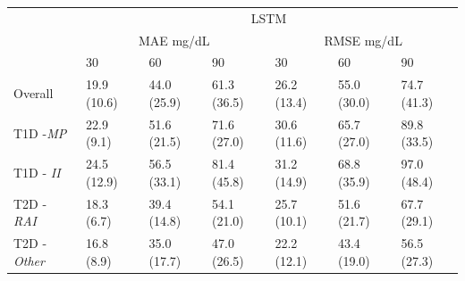 \begin{table}[b!]
\begin{tabular}{lllllll}
			& \multicolumn{6}{c}{LSTM}                                              \\ \cline{2-7}
			\multicolumn{1}{l|}{}                           & \multicolumn{3}{c|}{MAE mg/dL}          & \multicolumn{3}{c|}{RMSE mg/dL}         \\ \cline{2-7}
			\multicolumn{1}{l|}{}                           & 30 & 60 & \multicolumn{1}{l|}{90} & 30 & 60 & \multicolumn{1}{l|}{90} \\ \hline
			\multicolumn{1}{l|}{Overall}                & 19.9 (10.6) & 44.0 (25.9) & \multicolumn{1}{l|}{61.3 (36.5)} & 26.2 (13.4) & 55.0 (30.0) & \multicolumn{1}{l|}{74.7 (41.3)} \\
			\multicolumn{1}{l|}{T1D -{\sl  MP}}   & 22.9 (9.1) & 51.6 (21.5) & \multicolumn{1}{l|}{71.6 (27.0)} & 30.6 (11.6) & 65.7 (27.0) & \multicolumn{1}{l|}{89.8 (33.5)} \\
			\multicolumn{1}{l|}{T1D - {\sl II}}    & 24.5 (12.9) & 56.5 (33.1) & \multicolumn{1}{l|}{81.4 (45.8)} & 31.2 (14.9) & 68.8 (35.9) & \multicolumn{1}{l|}{97.0 (48.4)} \\
			\multicolumn{1}{l|}{T2D - {\sl RAI}} & 18.3 (6.7) & 39.4 (14.8) & \multicolumn{1}{l|}{54.1 (21.0)} & 25.7 (10.1) & 51.6 (21.7) & \multicolumn{1}{l|}{67.7 (29.1)} \\
			\multicolumn{1}{l|}{T2D - {\sl Other}}      & 16.8 (8.9) & 35.0 (17.7) & \multicolumn{1}{l|}{47.0 (26.5)} & 22.2 (12.1) & 43.4 (19.0) & \multicolumn{1}{l|}{56.5 (27.3)} \\ 
			
			\hline
			
		\end{tabular}
\end{table}
